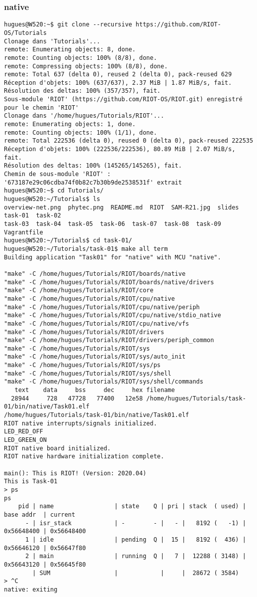 \subsubsection{native}
{\footnotesize
\begin{verbatim}
hugues@W520:~$ git clone --recursive https://github.com/RIOT-OS/Tutorials
Clonage dans 'Tutorials'...
remote: Enumerating objects: 8, done.
remote: Counting objects: 100% (8/8), done.
remote: Compressing objects: 100% (8/8), done.
remote: Total 637 (delta 0), reused 2 (delta 0), pack-reused 629
Réception d'objets: 100% (637/637), 2.37 MiB | 1.87 MiB/s, fait.
Résolution des deltas: 100% (357/357), fait.
Sous-module 'RIOT' (https://github.com/RIOT-OS/RIOT.git) enregistré pour le chemin 'RIOT'
Clonage dans '/home/hugues/Tutorials/RIOT'...
remote: Enumerating objects: 1, done.        
remote: Counting objects: 100% (1/1), done.        
remote: Total 222536 (delta 0), reused 0 (delta 0), pack-reused 222535        
Réception d'objets: 100% (222536/222536), 80.89 MiB | 2.07 MiB/s, fait.
Résolution des deltas: 100% (145265/145265), fait.
Chemin de sous-module 'RIOT' : '673187e29c06cdba74f0b82c7b30b9de2538531f' extrait
hugues@W520:~$ cd Tutorials/
hugues@W520:~/Tutorials$ ls
overview-net.png  phytec.png  README.md  RIOT  SAM-R21.jpg  slides  task-01  task-02
task-03  task-04  task-05  task-06  task-07  task-08  task-09  Vagrantfile
hugues@W520:~/Tutorials$ cd task-01/
hugues@W520:~/Tutorials/task-01$ make all term
Building application "Task01" for "native" with MCU "native".

"make" -C /home/hugues/Tutorials/RIOT/boards/native
"make" -C /home/hugues/Tutorials/RIOT/boards/native/drivers
"make" -C /home/hugues/Tutorials/RIOT/core
"make" -C /home/hugues/Tutorials/RIOT/cpu/native
"make" -C /home/hugues/Tutorials/RIOT/cpu/native/periph
"make" -C /home/hugues/Tutorials/RIOT/cpu/native/stdio_native
"make" -C /home/hugues/Tutorials/RIOT/cpu/native/vfs
"make" -C /home/hugues/Tutorials/RIOT/drivers
"make" -C /home/hugues/Tutorials/RIOT/drivers/periph_common
"make" -C /home/hugues/Tutorials/RIOT/sys
"make" -C /home/hugues/Tutorials/RIOT/sys/auto_init
"make" -C /home/hugues/Tutorials/RIOT/sys/ps
"make" -C /home/hugues/Tutorials/RIOT/sys/shell
"make" -C /home/hugues/Tutorials/RIOT/sys/shell/commands
   text	   data	    bss	    dec	    hex	filename
  28944	    728	  47728	  77400	  12e58	/home/hugues/Tutorials/task-01/bin/native/Task01.elf
/home/hugues/Tutorials/task-01/bin/native/Task01.elf  
RIOT native interrupts/signals initialized.
LED_RED_OFF
LED_GREEN_ON
RIOT native board initialized.
RIOT native hardware initialization complete.

main(): This is RIOT! (Version: 2020.04)
This is Task-01
> ps
ps
	pid | name                 | state    Q | pri | stack  ( used) | base addr  | current     
	  - | isr_stack            | -        - |   - |   8192 (   -1) | 0x56648400 | 0x56648400
	  1 | idle                 | pending  Q |  15 |   8192 (  436) | 0x56646120 | 0x56647f80 
	  2 | main                 | running  Q |   7 |  12288 ( 3148) | 0x56643120 | 0x56645f80 
	    | SUM                  |            |     |  28672 ( 3584)
> ^C
native: exiting
\end{verbatim}
}

